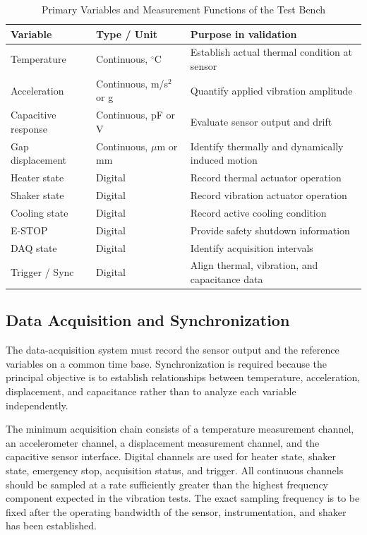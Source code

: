\documentclass[conference]{IEEEtran}
\begin{document}
\begin{table}[t]
\caption{Primary Variables and Measurement Functions of the Test Bench}
\label{tab:variables}
\centering
\footnotesize
\begin{tabular}{p{} p{} p{}}
\toprule
\textbf{Variable} & \textbf{Type / Unit} & \textbf{Purpose in validation} \\
\midrule
Temperature & Continuous, $^{\circ}$C & Establish actual thermal condition at sensor \\
Acceleration & Continuous, m/s$^2$ or g & Quantify applied vibration amplitude \\
Capacitive response & Continuous, pF or V & Evaluate sensor output and drift \\
Gap displacement & Continuous, $\mu$m or mm & Identify thermally and dynamically induced motion \\
Heater state & Digital & Record thermal actuator operation \\
Shaker state & Digital & Record vibration actuator operation \\
Cooling state & Digital & Record active cooling condition \\
E-STOP & Digital & Provide safety shutdown information \\
DAQ state & Digital & Identify acquisition intervals \\
Trigger / Sync & Digital & Align thermal, vibration, and capacitance data \\
\bottomrule
\end{tabular}
\end{table}

\subsection{Data Acquisition and Synchronization}

The data-acquisition system must record the sensor output and the reference variables on a common time base. Synchronization is required because the principal objective is to establish relationships between temperature, acceleration, displacement, and capacitance rather than to analyze each variable independently.

The minimum acquisition chain consists of a temperature measurement channel, an accelerometer channel, a displacement measurement channel, and the capacitive sensor interface. Digital channels are used for heater state, shaker state, emergency stop, acquisition status, and trigger. All continuous channels should be sampled at a rate sufficiently greater than the highest frequency component expected in the vibration tests. The exact sampling frequency is to be fixed after the operating bandwidth of the sensor, instrumentation, and shaker has been established.
\end{document}
